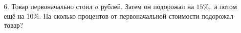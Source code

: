 6. Товар первоначально стоил $a$ рублей. Затем он подорожал на $15\%,$ а потом ещё на $10\%.$ На сколько процентов от первоначальной стоимости подорожал товар?\\
